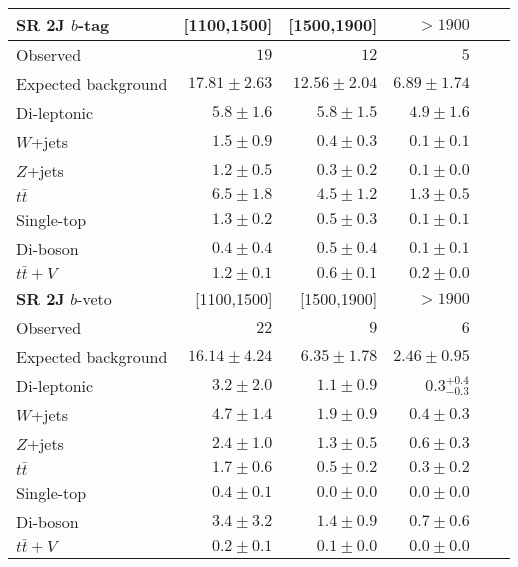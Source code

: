 \begin{tabular*}{\textwidth}{@{\extracolsep{\fill}}lrrrrr}
\toprule
\textbf{SR 2J} $b$-tag & [1100,1500] & [1500,1900] & $>1900$ \\
\midrule

Observed          & $19$              & $12$              & $5$                    \\
\midrule
Expected background         & $17.81 \pm 2.63$          & $12.56 \pm 2.04$          & $6.89 \pm 1.74$              \\
\midrule
        Di-leptonic         & $5.8 \pm 1.6$          & $5.8 \pm 1.5$          & $4.9 \pm 1.6$              \\
        $W$+jets         & $1.5 \pm 0.9$          & $0.4 \pm 0.3$          & $0.1 \pm 0.1$              \\
        $Z$+jets         & $1.2 \pm 0.5$          & $0.3 \pm 0.2$          & $0.1 \pm 0.0$              \\
        $t\bar{t}$         & $6.5 \pm 1.8$          & $4.5 \pm 1.2$          & $1.3 \pm 0.5$              \\
        Single-top         & $1.3 \pm 0.2$          & $0.5 \pm 0.3$          & $0.1 \pm 0.1$              \\
        Di-boson         & $0.4 \pm 0.4$          & $0.5 \pm 0.4$          & $0.1 \pm 0.1$              \\
        $t\bar{t}+V$         & $1.2 \pm 0.1$          & $0.6 \pm 0.1$          & $0.2 \pm 0.0$              \\
\toprule
\textbf{SR 2J} $b$-veto & [1100,1500] & [1500,1900] & $>1900$ \\
\midrule
Observed          & $22$              & $9$              & $6$                    \\
\midrule
Expected background         & $16.14 \pm 4.24$          & $6.35 \pm 1.78$          & $2.46 \pm 0.95$              \\
\midrule
        Di-leptonic         & $3.2 \pm 2.0$          & $1.1 \pm 0.9$          & $0.3_{-0.3}^{+0.4}$              \\
        $W$+jets         & $4.7 \pm 1.4$          & $1.9 \pm 0.9$          & $0.4 \pm 0.3$              \\
        $Z$+jets         & $2.4 \pm 1.0$          & $1.3 \pm 0.5$          & $0.6 \pm 0.3$              \\
        $t\bar{t}$         & $1.7 \pm 0.6$          & $0.5 \pm 0.2$          & $0.3 \pm 0.2$              \\
        Single-top         & $0.4 \pm 0.1$          & $0.0 \pm 0.0$          & $0.0 \pm 0.0$              \\
        Di-boson         & $3.4 \pm 3.2$          & $1.4 \pm 0.9$          & $0.7 \pm 0.6$              \\
        $t\bar{t}+V$         & $0.2 \pm 0.1$          & $0.1 \pm 0.0$          & $0.0 \pm 0.0$              \\


\bottomrule
\end{tabular*}




